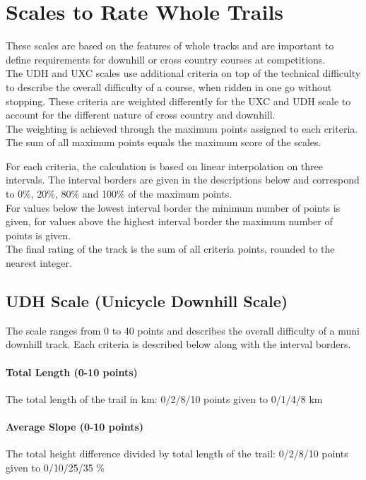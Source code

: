 \documentclass[a4paper,oneside]{scrartcl}
\begin{document}
\section{Scales to Rate Whole Trails}
\label{sec:muni-difficulty-udh-uxc}

These scales are based on the features of whole tracks and are important to
define requirements for downhill or cross country courses at competitions.\\
The UDH and UXC scales use additional criteria on top of the technical difficulty
to describe the overall difficulty of a course, when ridden in one go without stopping.
These criteria are weighted differently for the UXC and UDH scale to account for the
different nature of cross country and downhill.\\
The weighting is achieved through the maximum points assigned to each criteria. The sum
of all maximum points equals the maximum score of the scales.

For each criteria, the calculation is based on linear interpolation on three intervals.
The interval borders are given in the descriptions below and correspond to 0\%,
20\%, 80\% and 100\% of the maximum points.\\
For values below the lowest interval border the minimum number of points is
given, for values above the highest interval border the maximum number of points
is given.\\
The final rating of the track is the sum of all criteria points, rounded to the nearest integer.

\subsection{UDH Scale (Unicycle Downhill Scale)}
\label{sec:udh-scale}

The scale ranges from 0 to 40 points and describes the overall difficulty of a
muni downhill track. Each criteria is described below along with the
interval borders.

\paragraph{Total Length (0-10 points)}
The total length of the trail in km: 0/2/8/10 points given to 0/1/4/8 km

\paragraph{Average Slope (0-10 points)}
The total height difference divided by total length of the trail: 0/2/8/10
points given to 0/10/25/35 \%
\end{document}

